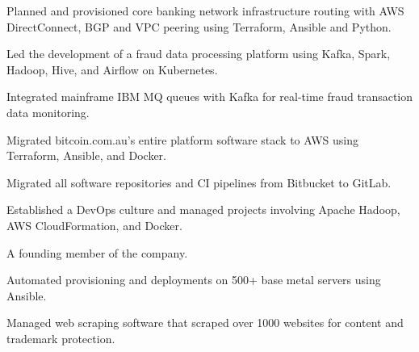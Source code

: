 \documentclass[]{resume}
\begin{document}
\begin{minipage}[t]{0.60\textwidth}
\begin{tightemize}
\item Planned and provisioned core banking network infrastructure routing with AWS DirectConnect, BGP and VPC peering using Terraform, Ansible and Python.
\end{tightemize}
\sectionsep

\begin{tightemize}
\item Led the development of a fraud data processing platform using Kafka, Spark, Hadoop, Hive, and Airflow on Kubernetes.
\item Integrated mainframe IBM MQ queues with Kafka for real-time fraud transaction data monitoring.
\end{tightemize}
\sectionsep

\begin{tightemize}
\item Migrated bitcoin.com.au's entire platform software stack to AWS using Terraform, Ansible, and Docker.
\item Migrated all software repositories and CI pipelines from Bitbucket to GitLab.
\end{tightemize}
\sectionsep

\begin{tightemize}
\item Established a DevOps culture and managed projects involving Apache Hadoop, AWS CloudFormation, and Docker.
\end{tightemize}
\sectionsep

\begin{tightemize}
\item A founding member of the company.
\item Automated provisioning and deployments on 500+ base metal servers using Ansible.
\item Managed web scraping software that scraped over 1000 websites for content and trademark protection.
\end{tightemize}
\sectionsep

%
%

\end{minipage}
\end{document}
